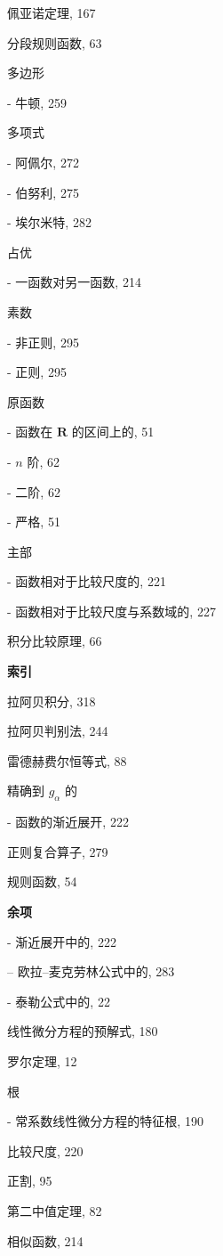 佩亚诺定理, 167

分段规则函数, 63

多边形

- 牛顿, 259

多项式

- 阿佩尔, 272

- 伯努利, 275

- 埃尔米特, 282

占优

- 一函数对另一函数, 214

素数

- 非正则, 295

- 正则, 295

原函数

- 函数在 \(\mathbf{R}\) 的区间上的, 51

- \(n\) 阶, 62

- 二阶, 62

- 严格, 51

主部

- 函数相对于比较尺度的, 221

- 函数相对于比较尺度与系数域的, 227

积分比较原理, 66

\par\noindent\textbf{索引}\par

拉阿贝积分, 318

拉阿贝判别法, 244

雷德赫费尔恒等式, 88

精确到 \(g_{\alpha}\) 的

- 函数的渐近展开, 222

正则复合算子, 279

规则函数, 54

\par\noindent\textbf{余项}\par

- 渐近展开中的, 222

-- 欧拉–麦克劳林公式中的, 283

- 泰勒公式中的, 22

线性微分方程的预解式, 180

罗尔定理, 12

根

- 常系数线性微分方程的特征根, 190

比较尺度, 220

正割, 95

第二中值定理, 82

相似函数, 214

